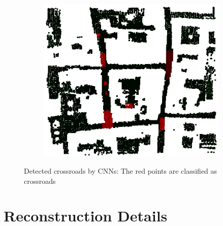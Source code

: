 \documentclass[11pt]{article}
\begin{document}
    \begin{figure}
    \centering
    \begin{subfigure}{0.45\textwidth}
        \includegraphics[width=\textwidth,keepaspectratio]{images/experiment/res_deep}
    \end{subfigure}
    \caption{Detected crossroads by CNNs: The red points are classified as crossroads}
    \label{fig:res_deep}
    \end{figure}

    \section{Reconstruction Details}
\end{document}

